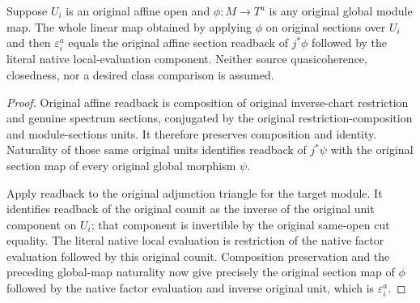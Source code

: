 \begin{corollary}
\label{cor:di-total-cup-member-affine-readback}
\leanok
Suppose $U_i$ is an original affine open and $\phi:M\to T^a$ is any
original global module map. The whole linear map obtained by applying
$\phi$ on original sections over $U_i$ and then $\varepsilon_i^a$
equals the original affine section readback of $j^*\phi$ followed by
the literal native local-evaluation component. Neither source
quasicoherence, closedness, nor a desired class comparison is assumed.
\end{corollary}
\begin{proof}
\leanok
Original affine readback is composition of original inverse-chart
restriction and genuine spectrum sections, conjugated by the original
restriction-composition and module-sections units. It therefore
preserves composition and identity. Naturality of those same original
units identifies readback of $j^*\psi$ with the original section map
of every original global morphism $\psi$.

Apply readback to the original adjunction triangle for the target
module. It identifies readback of the original counit as the inverse
of the original unit component on $U_i$; that component is invertible
by the original same-open cut equality. The literal native local
evaluation is restriction of the native factor evaluation followed
by this original counit. Composition preservation and the preceding
global-map naturality now give precisely the original section map
of $\phi$ followed by the native factor evaluation and inverse
original unit, which is $\varepsilon_i^a$.
\end{proof}
